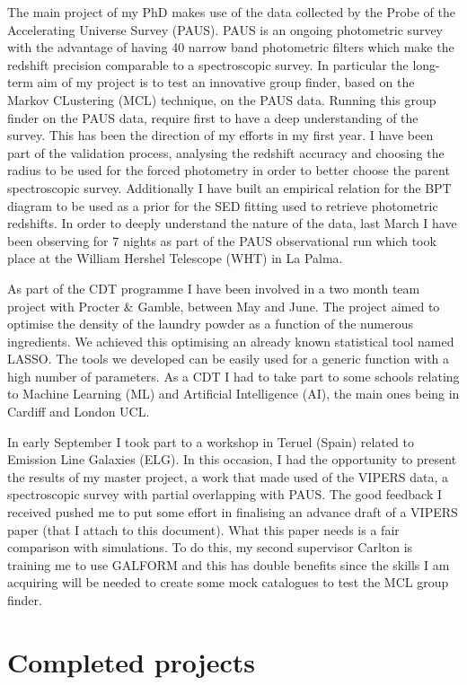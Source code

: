 \documentclass[letterpaper]{article}
\begin{document}
The main project of my PhD makes use of the data collected by the Probe of the Accelerating Universe Survey (PAUS). PAUS is an ongoing photometric survey with the advantage of having 40 narrow band photometric filters which make the redshift precision comparable to a spectroscopic survey. In particular the long-term aim of my project is to test an innovative group finder, based on the Markov CLustering (MCL) technique, on the PAUS data. Running this group finder on the PAUS data, require first to have a deep understanding of the survey. This has been the direction of my efforts in my first year. I have been part of the validation process, analysing the redshift accuracy and choosing the radius to be used for the forced photometry in order to better choose the parent spectroscopic survey. Additionally I have built an empirical relation for the BPT diagram to be used as a prior for the SED fitting used to retrieve photometric redshifts. In order to deeply understand the nature of the data, last March I have been observing for 7 nights as part of the PAUS observational run which took place at the William Hershel Telescope (WHT) in La Palma. 

As part of the CDT programme I have been involved in a two month team project with Procter $\&$ Gamble, between May and June. The project aimed to optimise the density of the laundry powder as a function of the numerous ingredients. We achieved this optimising an already known statistical tool named LASSO. The tools we developed can be easily used for a generic function with a high number of parameters. As a CDT I had to take part to some schools relating to Machine Learning (ML) and Artificial Intelligence (AI), the main ones being in Cardiff and London UCL.

In early September I took part to a workshop in Teruel (Spain) related to Emission Line Galaxies (ELG). In this occasion, I had the opportunity to present the results of my master project, a work that made used of the VIPERS data, a spectroscopic survey with partial overlapping with PAUS. The good feedback I received pushed me to put some effort in finalising an advance draft of a VIPERS paper (that I attach to this document). What this paper needs is a fair comparison with simulations. To do this, my second supervisor Carlton is training me to use GALFORM and this has double benefits since the skills I am acquiring will be needed to create some mock catalogues to test the MCL group finder.


\section{Completed projects}
\label{sec:complete}
\end{document}
